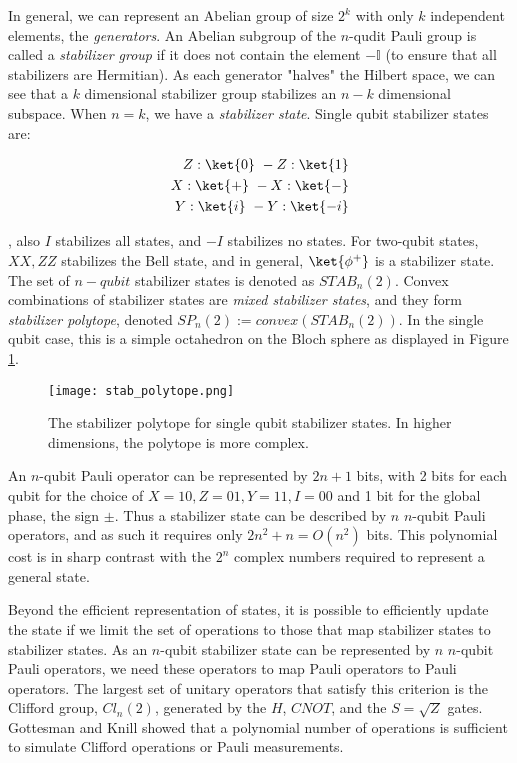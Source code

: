 In general, we can represent an Abelian group of size $2^k$ with only $k$ independent elements, the \textit{generators}. An Abelian subgroup of the $n$-qudit Pauli group is called a \textit{stabilizer group} if it does not contain the element $- \mathbb{I}$ (to ensure that all stabilizers are Hermitian). As each generator "halves" the Hilbert space, we can see that a $k$ dimensional stabilizer group stabilizes an $n-k$ dimensional subspace. When $n=k$, we have a \textit{stabilizer state}. Single qubit stabilizer states are:

\begin{align*}
Z: \ket{0} \ -Z: \ket{1} \\
X: \ket{+} \ -X: \ket{-} \\
Y: \ket{i} \ -Y: \ket{-i}
\end{align*}

, also $I$ stabilizes all states, and $-I$ stabilizes no states. For two-qubit states, $XX,ZZ$ stabilizes the Bell state, and in general, $\ket{\phi^+}$ is a stabilizer state. The set of $n-qubit$ stabilizer states is denoted as $STAB_n(2)$. Convex combinations of stabilizer states are \textit{mixed stabilizer states}, and they form \textit{stabilizer polytope}, denoted $SP_n(2):=convex(STAB_n(2))$. In the single qubit case, this is a simple octahedron on the Bloch sphere as displayed in Figure \ref{fig:stab_polytope}. 

\begin{figure}[!ht]
\center
\texttt{[image: stab\_polytope.png]}
\caption{The stabilizer polytope for single qubit stabilizer states. In higher dimensions, the polytope is more complex.}
\label{fig:stab_polytope}
\end{figure}


An $n$-qubit Pauli operator can be represented by $2n+1$ bits, with 2 bits for each qubit for the choice of $X=10, Z=01, Y=11, I=00$ and 1 bit for the global phase, the sign $\pm$. Thus a stabilizer state can be described by $n$ $n$-qubit Pauli operators, and as such it requires only $2n^2 + n=O(n^2)$ bits. This polynomial cost is in sharp contrast with the $2^n$ complex numbers required to represent a general state. 

Beyond the efficient representation of states, it is possible to efficiently update the state if we limit the set of operations to those that map stabilizer states to stabilizer states. As an $n$-qubit stabilizer state can be represented by $n$ $n$-qubit Pauli operators, we need these operators to map Pauli operators to Pauli operators. The largest set of unitary operators that satisfy this criterion is the Clifford group, $Cl_n(2)$, generated by the $H$, $CNOT$, and the $S=\sqrt{Z}$ gates. Gottesman and Knill showed that a polynomial number of operations is sufficient to simulate Clifford operations or Pauli measurements.

